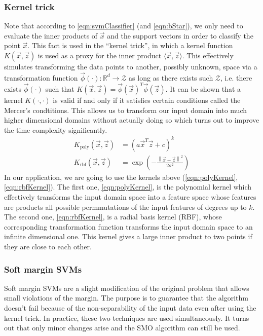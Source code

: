 \subsubsection{Kernel trick}
	Note that according to \eqref{eqn:svmClassifier} (and \eqref{eqn:bStar}), we only need to evaluate the inner products of $\vec x$ and the support vectors in order to classify the point $\vec x$. This fact is used in the ``kernel trick'', in which a kernel function $K(\vec x, \vec z)$ is used as a proxy for the inner product $\langle \vec x, \vec z \rangle$. This effectively simulates transforming the data points to another, possibly unknown, space via a transformation function $\vec\phi (\cdot): \mathbb{R}^d \to \mathcal{Z}$ as long as there exists such $\mathcal{Z}$, i.e. there exists $\vec\phi (\cdot)$ such that $K(\vec x, \vec z) = \vec\phi (\vec x)^T \vec\phi (\vec z)$. It can be shown that a kernel $K(\cdot, \cdot)$ is valid if and only if it satisfies certain conditions called the Mercer's condtitions. This allows us to transform our input domain into much higher dimensional domains without actually doing so which turns out to improve the time complexity significantly.
	\begin{align}
		K_\text{poly}(\vec x, \vec z) & = \left( a \vec x^T \vec z  + c \right)^k \label{eqn:polyKernel} \\
		K_\text{rbf}(\vec x, \vec z) & = \exp{\left( - \frac{\left\| \vec x - \vec z \right\|^2}{2\sigma^2} \right)} \label{eqn:rbfKernel}
	\end{align}
In our application, we are going to use the kernels above (\ref{eqn:polyKernel}, \ref{eqn:rbfKernel}). The first one, \eqref{eqn:polyKernel}, is the polynomial kernel which effectively transforms the input domain space into a feature space whose features are products all possible permmutations of the input features of degrees up to $k$. The second one, \eqref{eqn:rbfKernel}, is a radial basis kernel (RBF), whose corresponding transformation function transforms the input domain space to an infinite dimensional one. This kernel gives a large inner product to two points if they are close to each other.

\subsubsection{Soft margin SVMs}
	Soft margin SVMs are a slight modification of the original problem that allows small violations of the margin. The purpose is to guarantee that the algorithm doesn't fail because of the non-separability of the input data even after using the kernel trick. In practice, these two techniques are used simultaneously. It turns out that only minor changes arise and the SMO algorithm can still be used.
	
